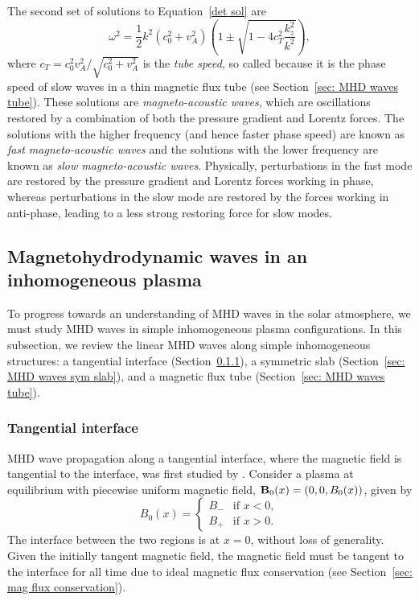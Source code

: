 The second set of solutions to Equation~\eqref{det sol} are
\begin{equation}
	\omega^2 = \frac{1}{2}k^2(c_0^2 + v_A^2)\left(1 \pm \sqrt{1 - 4c_T^2\frac{k_z^2}{k^2}}\right),
\end{equation}
where $c_T = c_0^2v_A^2/\sqrt{c_0^2 + v_A^2}$ is the \textit{tube speed}, so called because it is the phase speed of slow waves in a thin magnetic flux tube (see Section~\ref{sec: MHD waves tube}). These solutions are \textit{magneto-acoustic waves}, which are oscillations restored by a combination of both the pressure gradient and Lorentz forces. The solutions with the higher frequency (and hence faster phase speed) are known as \textit{fast magneto-acoustic waves} and the solutions with the lower frequency are known as \textit{slow magneto-acoustic waves}. Physically, perturbations in the fast mode are restored by the pressure gradient and Lorentz forces working in phase, whereas perturbations in the slow mode are restored by the forces working in anti-phase, leading to a less strong restoring force for slow modes.


\subsection{Magnetohydrodynamic waves in an inhomogeneous plasma}
To progress towards an understanding of MHD waves in the solar atmosphere, we must study MHD waves in simple inhomogeneous plasma configurations. In this subsection, we review the linear MHD waves along simple inhomogeneous structures: a tangential interface (Section~\ref{sec: MHD waves interface}), a symmetric slab (Section~\ref{sec: MHD waves sym slab}), and a magnetic flux tube (Section~\ref{sec: MHD waves tube}).


\subsubsection{Tangential interface} \label{sec: MHD waves interface}

MHD wave propagation along a tangential interface, where the magnetic field is tangential to the interface, was first studied by \cite{rob81a}. Consider a plasma at equilibrium  with piecewise uniform magnetic field, $\mathbf{B}_0(x) = (0, 0, B_0(x))$, given by
\begin{equation}
	B_0(x) =
	\begin{cases}
		B_- & \text{if } x < 0, \\
		B_+ & \text{if } x > 0.
	\end{cases} \label{interface mag}
\end{equation}
The interface between the two regions is at $x = 0$, without loss of generality. Given the initially tangent magnetic field, the magnetic field must be tangent to the interface for all time due to ideal magnetic flux conservation (see Section~\ref{sec: mag flux conservation}).

